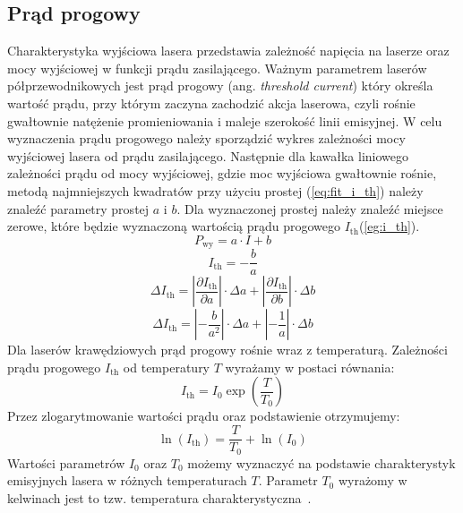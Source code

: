 \subsection{Prąd progowy}
Charakterystyka wyjściowa lasera przedstawia zależność napięcia na laserze oraz mocy wyjściowej w funkcji prądu zasilającego.
Ważnym parametrem laserów półprzewodnikowych jest prąd progowy (ang. \textit{threshold
current}) który określa wartość prądu, przy którym zaczyna zachodzić akcja laserowa, czyli
rośnie gwałtownie natężenie promieniowania i maleje szerokość linii emisyjnej. W celu wyznaczenia prądu progowego należy
sporządzić wykres zależności mocy wyjściowej lasera od prądu zasilającego. Następnie dla kawałka liniowego zależności prądu
od mocy wyjściowej, gdzie moc wyjściowa gwałtownie rośnie, metodą najmniejszych kwadratów przy użyciu prostej (\ref{eq:fit_i_th}) należy
znaleźć parametry prostej $a$ i $b$.
Dla wyznaczonej prostej należy znaleźć miejsce zerowe, które będzie wyznaczoną wartością prądu progowego $I_{\mathrm{th}}$(\ref{eg:i_th}).
\begin{equation}
\label{eq:fit_i_th}
P_{\mathrm{wy}} = a \cdot I + b
\end{equation}
\begin{equation}
\label{eg:i_th}
I_{\mathrm{th}} = -\frac{b}{a}
\end{equation}
\begin{equation}
\Delta I_{\mathrm{th}} = \left\lvert \frac{\partial I_{\mathrm{th}}}{\partial a} \right\rvert \cdot \Delta a + \left\lvert \frac{\partial I_{\mathrm{th}}}{\partial b} \right\rvert \cdot \Delta b
\end{equation}
\begin{equation}
\Delta I_{\mathrm{th}} = \left\lvert -\frac{b}{a^2} \right\rvert \cdot \Delta a + \left\lvert -\frac{1}{a} \right\rvert \cdot \Delta b
\end{equation}
Dla laserów krawędziowych prąd progowy rośnie wraz z temperaturą.
Zależności prądu progowego $I_{\mathrm{th}}$ od temperatury $T$ wyrażamy w postaci równania:
\begin{equation}
\label{eq:i_th}
I_{\mathrm{th}} = I_0 \exp \left( \frac{T}{T_0} \right)
\end{equation}
Przez zlogarytmowanie wartości prądu oraz podstawienie otrzymujemy:
\begin{equation}
\ln(I_{\mathrm{th}}) = \frac{T}{T_0} + \ln(I_0)
\end{equation}
Wartości parametrów $I_0$ oraz $T_0$ możemy wyznaczyć na podstawie charakterystyk
emisyjnych lasera w różnych temperaturach $T$. Parametr
$T_{0}$ wyrażomy w kelwinach jest to tzw. temperatura charakterystyczna~\cite{opto_book}.


